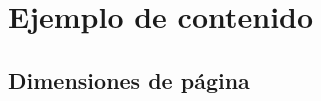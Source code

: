 \chapter{Ejemplo de contenido}
\label{app:add-content}

\section{Dimensiones de página}


\blindtext